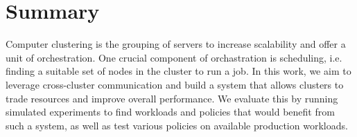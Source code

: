 \section{Summary}
Computer clustering is the grouping of servers to increase scalability and offer a unit of orchestration. 
One crucial component of orchastration is scheduling, i.e. finding a suitable set of nodes in the cluster 
to run a job. In this work, we aim to leverage cross-cluster communication and build a system that allows 
clusters to trade resources and improve overall performance. 
We evaluate this by running simulated experiments to find workloads and policies that 
would benefit from such a system, as well as test various policies on available production workloads.